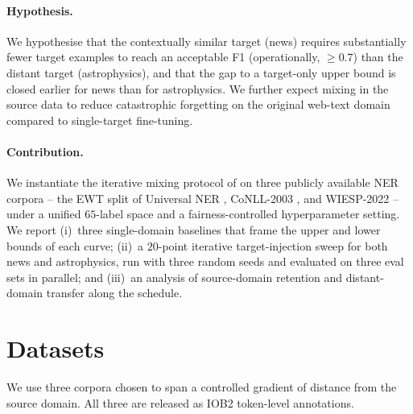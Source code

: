 \documentclass[11pt]{article}
\begin{document}
\paragraph{Hypothesis.}
We hypothesise that the contextually similar target (news) requires
substantially fewer target examples to reach an acceptable F1 (operationally,
$\geq 0.7$) than the distant target (astrophysics), and that the gap to a
target-only upper bound is closed earlier for news than for astrophysics. We
further expect mixing in the source data to reduce catastrophic forgetting on
the original web-text domain compared to single-target fine-tuning.

\paragraph{Contribution.}
We instantiate the iterative mixing protocol of \citet{liu-etal-2021-crossner}
on three publicly available NER corpora -- the EWT split of Universal NER
\citep{mayhew-etal-2024-universal}, CoNLL-2003 \citep{tjong-kim-sang-de-meulder-2003-introduction},
and WIESP-2022 \citep{grezes-etal-2022-overview} -- under a unified $65$-label
space and a fairness-controlled hyperparameter setting. We report (i)~three
single-domain baselines that frame the upper and lower bounds of each curve;
(ii)~a $20$-point iterative target-injection sweep for both news and
astrophysics, run with three random seeds and evaluated on three eval sets in
parallel; and (iii)~an analysis of source-domain retention and
distant-domain transfer along the schedule.

\section{Datasets}
\label{sec:datasets}

We use three corpora chosen to span a controlled gradient of distance from
the source domain. All three are released as IOB2 token-level annotations.
\end{document}
